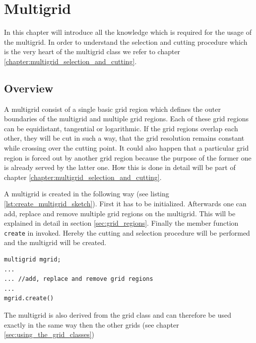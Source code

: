 \chapter{Multigrid} \label{chapter:multigrid_usage}
In this chapter will introduce all the knowledge which is required for the usage of the multigrid. In order to understand the selection and cutting procedure which is the very heart of the multigrid class we refer to chapter \ref{chapter:multigrid_selection_and_cutting}.

\section{Overview}
A multigrid consist of a single basic grid region which defines the outer boundaries of the multigrid and multiple grid regions. Each of these grid regions can be equidistant, tangential or logarithmic. If the grid regions overlap each other, they will be cut in such a way, that the grid resolution remains constant while crossing over the cutting point. It could also happen that a particular grid region is forced out by another grid region because the purpose of the former one is already served by the latter one. How this is done in detail will be part of chapter \ref{chapter:multigrid_selection_and_cutting}.

A multigrid is created in the following way (see listing \ref{lst:create_multigrid_sketch}). First it has to be initialized. Afterwards one can add, replace and remove multiple grid regions on the multigrid. This will be explained in detail in section \ref{sec:grid_regions}. Finally the member function \texttt{create} in invoked. Hereby the cutting and selection procedure will be performed and the multigrid will be created. 
\begin{lstlisting}[caption={Creating a multigrid},	label={lst:create_multigrid_sketch}]
multigrid mgrid;
... 
... //add, replace and remove grid regions
...
mgrid.create()
\end{lstlisting}
The multigrid is also derived from the grid class and can therefore be used exactly in the same way then the other grids (see chapter \ref{sec:using_the_grid_classes})


